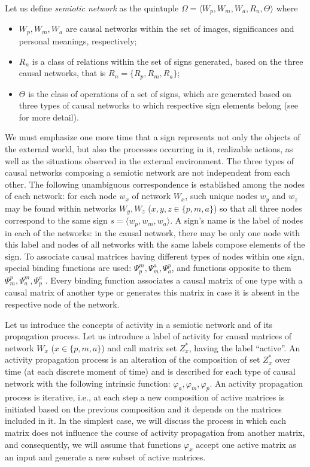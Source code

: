 \documentclass[review]{elsarticle}
\begin{document}
Let us define \textit {semiotic network} as the quintuple $\Omega=\langle W_p, W_m, W_a, R_n, \Theta \rangle$ where
\begin{itemize}
	\item $W_p, W_m, W_a$ are causal networks within the set of images, significances and personal meanings, respectively;
	\item $R_n$ is a class of relations within the set of signs generated, based on the three causal networks, that is $R_n=\{R_p, R_m, R_a\}$;
	\item $\Theta$ is the class of operations of a set of signs, which are generated based on three types of causal networks to which respective sign elements belong (see \cite{Osipov2014c} for more detail).
\end{itemize} 

We must emphasize one more time that a sign represents not only the objects of the external world, but also the processes occurring in it, realizable actions, as well as the situations observed in the external environment. The three types of causal networks composing a semiotic network are not independent from each other. The following unambiguous correspondence is established among the nodes of each network: for each node $w_x$ of network $W_x$, such unique nodes $w_y$ and $w_z$ may be found within networks $W_y, W_z$ ($x,y,z\in\{p,m,a\}$) so that all three nodes correspond to the same sign $s=\langle w_p, w_m, w_a\rangle$. A sign's name is the label of nodes in each of the networks: in the causal network, there may be only one node with this label and nodes of all networks with the same labels compose elements of the sign. To associate causal matrices having different types of nodes within one sign, special binding functions are used: $\Psi_p^m, \Psi_m^a,\Psi_a^p$, and functions opposite to them $\Psi_m^p,\Psi_a^m,\Psi_p^a$ \cite{Osipov2014c}. Every binding function associates a causal matrix of one type with a causal matrix of another type or generates this matrix in case it is absent in the respective node of the network.

Let us introduce the concepts of activity in a semiotic network and of its propagation process. Let us introduce a label of activity for causal matrices of network $W_x$ ($x\in\{p,m,a\}$) and call matrix set $Z_x^*$, having the label ``active''. An activity propagation process is an alteration of the composition of set $Z_x^*$ over time (at each discrete moment of time) and is described for each type of causal network with the following intrinsic function: $\varphi_a, \varphi_m,\varphi_p$. An activity propagation process is iterative, i.e., at each step a new composition of active matrices is initiated based on the previous composition and it depends on the matrices included in it. In the simplest case, we will discuss the process in which each matrix does not influence the course of activity propagation from another matrix, and consequently, we will assume that functions $\varphi_x$ accept one active matrix as an input and generate a new subset of active matrices. 
\end{document}
